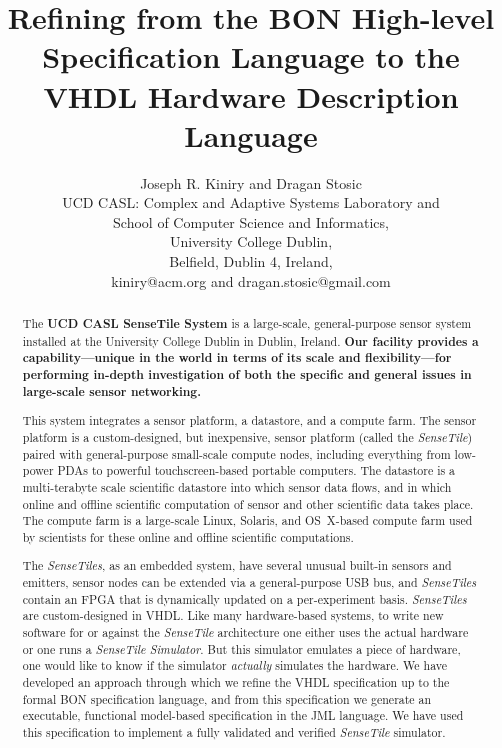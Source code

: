 \documentclass{article}
\newcommand{\ST}{\emph{SenseTile}\xspace}
\newcommand{\STs}{\emph{SenseTiles}\xspace}
\newcommand{\STS}{\emph{SenseTile Simulator}\xspace}
\begin{document}
\title{Refining from the BON High-level Specification Language to the
  VHDL Hardware Description Language}

\author{Joseph R. Kiniry and Dragan Stosic\\
UCD CASL: Complex and Adaptive Systems Laboratory and\\
School of Computer Science and Informatics,\\
University College Dublin,\\
Belfield, Dublin 4, Ireland,\\
kiniry@acm.org and dragan.stosic@gmail.com\\
}

\maketitle

\begin{abstract}
  
The \textbf{UCD CASL SenseTile System} is a large-scale, general-purpose
sensor system installed at the University College Dublin in Dublin,
Ireland.  \textbf{Our facility provides a capability---unique in the world in
terms of its scale and flexibility---for performing in-depth
investigation of both the specific and general issues in large-scale
sensor networking.}

This system integrates a sensor platform, a datastore, and a compute
farm.  The sensor platform is a custom-designed, but inexpensive,
sensor platform (called the \ST) paired with general-purpose
small-scale compute nodes, including everything from low-power PDAs to
powerful touchscreen-based portable computers.  The datastore is a
multi-terabyte scale scientific datastore into which sensor data
flows, and in which online and offline scientific computation of
sensor and other scientific data takes place.  The compute farm is a
large-scale Linux, Solaris, and OS~X-based compute farm used by
scientists for these online and offline scientific computations.

The \STs, as an embedded system, have several unusual built-in sensors 
and emitters, sensor nodes can be extended via a general-purpose USB bus, 
and \STs contain an FPGA that is dynamically updated on a per-experiment 
basis.  \STs are custom-designed in VHDL.  Like many hardware-based systems,
 to write new software for or against the \ST architecture one either uses
the actual hardware or one runs a \STS.  But this simulator emulates a
piece of hardware, one would like to know if the simulator
\emph{actually} simulates the hardware.  We have developed an approach
through which we refine the VHDL specification up to the formal BON
specification language, and from this specification we generate an
executable, functional model-based specification in the JML language.
We have used this specification to implement a fully validated and
verified \ST simulator.

\end{abstract}
\end{document}
